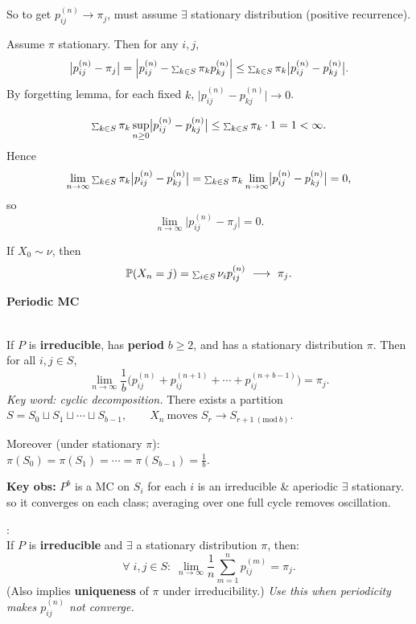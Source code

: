 \documentclass[a4paper, landscape]{article}
\newcommand{\topic}[1]{\par\medskip\textbf{#1}\par}
\newcommand{\subtopic}[1]{\par\textbf{#1}}
\newcommand{\smallsum}{\mathop{\scalebox{0.65}{$\sum$}}\nolimits}
\renewcommand{\topic}[1]{\par\medskip\noindent\colorbox{highlightcolor}{\parbox{\dimexpr\columnwidth-2\fboxsep\relax}{\textbf{#1}}}\par}
\renewcommand{\subtopic}[1]{\par\textbf{\color{blue}{#1}}} %
\begin{document}
\begin{multicols}{4}
So to get $p^{(n)}_{ij}\to\pi_j$, must assume $\exists$ stationary distribution (positive recurrence).

\subtopic{Main inequality (compare start $i$ vs start $\pi$):}
Assume $\pi$ stationary. Then for any $i,j$,
\[
\bigl|p^{(n)}_{ij}-\pi_j\bigr|
=
\Bigl|p^{(n)}_{ij}-\smallsum_{k\in S}\pi_k p^{(n)}_{kj}\Bigr|
\le
\smallsum_{k\in S}\pi_k\bigl|p^{(n)}_{ij}-p^{(n)}_{kj}\bigr|.
\]
By forgetting lemma, for each fixed $k$,
$\bigl|p^{(n)}_{ij}-p^{(n)}_{kj}\bigr|\to 0$.

\subtopic{Justify exchanging $\lim$ and $\sum$ (M-test):}
\[
\smallsum_{k\in S}\pi_k\sup_{n\ge0}\bigl|p^{(n)}_{ij}-p^{(n)}_{kj}\bigr|
\le
\smallsum_{k\in S}\pi_k\cdot 1
=
1<\infty.
\]
Hence
\[
\lim_{n\to\infty}\smallsum_{k\in S}\pi_k\bigl|p^{(n)}_{ij}-p^{(n)}_{kj}\bigr|
=
\smallsum_{k\in S}\pi_k\lim_{n\to\infty}\bigl|p^{(n)}_{ij}-p^{(n)}_{kj}\bigr|
=0,
\]
so
\[
\lim_{n\to\infty}\bigl|p^{(n)}_{ij}-\pi_j\bigr|=0.
\]

\subtopic{General initial distribution $\nu$:}
If $X_0\sim \nu$, then
\[
\mathbb P(X_n=j)=\smallsum_{i\in S}\nu_i p^{(n)}_{ij}\ \longrightarrow\ \pi_j.
\]


\newpage
\topic{Periodic MC}
\subtopic{Theorem: Periodic MC stationary convergence:}\\
If $P$ is \textbf{irreducible}, has \textbf{period} $b\ge 2$, and has a stationary distribution $\pi$.
Then for all $i,j\in S$,
\[
\lim_{n\to\infty}\frac1b\Big(p^{(n)}_{ij}+p^{(n+1)}_{ij}+\cdots+p^{(n+b-1)}_{ij}\Big)=\pi_j.
\]
\textit{Key word: cyclic decomposition.} There exists a partition
$S=S_0\sqcup S_1\sqcup\cdots\sqcup S_{b-1},\qquad
X_n\ \text{moves } S_r\to S_{r+1\ (\mathrm{mod}\ b)}$.

Moreover (under stationary $\pi$):\\
$\pi(S_0)=\pi(S_1)=\cdots=\pi(S_{b-1})=\frac1b$.

\textbf{Key obs:} $P^b$ is a MC on $S_i$ for each $i$ is an irreducible \& aperiodic $\exists$ stationary.
so it converges on each class; averaging over one full cycle removes oscillation.


\subtopic{Time-average convergence (always the safe one)}:\\
If $P$ is \textbf{irreducible} and $\exists$ a stationary distribution $\pi$, then:\\
\[
\forall\;i,j\in S:\;
\lim_{n\to\infty}\frac1n\sum_{m=1}^n p^{(m)}_{ij}=\pi_j.
\]
(Also implies \textbf{uniqueness} of $\pi$ under irreducibility.)
\textit{Use this when periodicity makes $p^{(n)}_{ij}$ not converge.}


\end{multicols}
\end{document}
